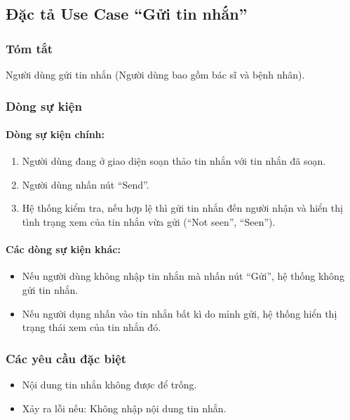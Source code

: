 \subsection{Đặc tả Use Case ``Gửi tin nhắn''}

\subsubsection{Tóm tắt}
Người dùng gửi tin nhắn (Người dùng bao gồm bác sĩ và bệnh nhân).

\subsubsection{Dòng sự kiện}
\paragraph{\textbf{Dòng sự kiện chính:}}
\begin{enumerate}
  \item Người dùng đang ở giao diện soạn thảo tin nhắn với tin nhắn đã soạn.
  \item Người dùng nhấn nút ``Send''.
  \item Hệ thống kiểm tra, nếu hợp lệ thì gửi tin nhắn đến người nhận và hiển thị tình trạng xem của tin nhắn vừa gửi (``Not seen'', ``Seen'').
\end{enumerate}

\paragraph{\textbf{Các dòng sự kiện khác:}}
  \begin{itemize}
    \item Nếu người dùng không nhập tin nhắn mà nhấn nút ``Gửi'', hệ thống không gửi tin nhắn.
    \item Nếu người dụng nhấn vào tin nhắn bất kì do mỉnh gửi, hệ thống hiển thị trạng thái xem của tin nhắn đó.
  \end{itemize}

\subsubsection{Các yêu cầu đặc biệt}
\begin{itemize}
  \item Nội dung tin nhắn không được để trống.
  \item Xảy ra lỗi nếu: Không nhập nội dung tin nhắn.
\end{itemize}

